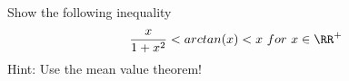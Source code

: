 Show the following inequality
\[\frac{x}{1+x^2}<arctan(x)<x \ for \ x\in \RR^+\]
Hint: Use the mean value theorem!
\begin{solution}
    
\end{solution}
